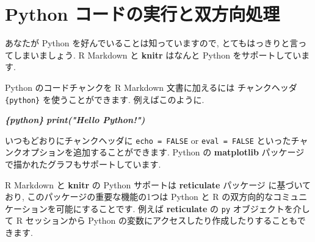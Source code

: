 \documentclass[
  11pt,
  lualatex,ja=standard,jafont=noto]{bxjsreport}
\newenvironment{Shaded}{\begin{snugshade}}{\end{snugshade}}
\newcommand{\InformationTok}[1]{\textcolor[rgb]{0.56,0.35,0.01}{\textbf{\textit{#1}}}}
\begin{document}
\hypertarget{eng-python}{%
\section{Python コードの実行と双方向処理}\label{eng-python}}

あなたが Python を好んでいることは知っていますので, とてもはっきりと言ってしまいましょう. R Markdown と \textbf{knitr} はなんと Python をサポートしています.

Python のコードチャンクを R Markdown 文書に加えるには チャンクヘッダ \texttt{\textasciigrave{}\textasciigrave{}\textasciigrave{}\{python\}} を使うことができます. 例えばこのように.

\begin{Shaded}
\begin{Highlighting}[]
\InformationTok{\textasciigrave{}\textasciigrave{}\textasciigrave{}\{python\}}
\InformationTok{print("Hello Python!")}
\InformationTok{\textasciigrave{}\textasciigrave{}\textasciigrave{}}
\end{Highlighting}
\end{Shaded}

いつもどおりにチャンクヘッダに \texttt{echo = FALSE} or \texttt{eval = FALSE} といったチャンクオプションを追加することができます. Python の \textbf{matplotlib} パッケージで描かれたグラフもサポートしています.

R Markdown と \textbf{knitr} の Python サポートは \textbf{reticulate} パッケージ \autocite{R-reticulate} に基づいており, このパッケージの重要な機能の1つは Python と R の双方向的なコミュニケーションを可能にすることです. 例えば \textbf{reticulate} の \texttt{py} オブジェクトを介して R セッションから Python の変数にアクセスしたり作成したりすることもできます.
\end{document}
